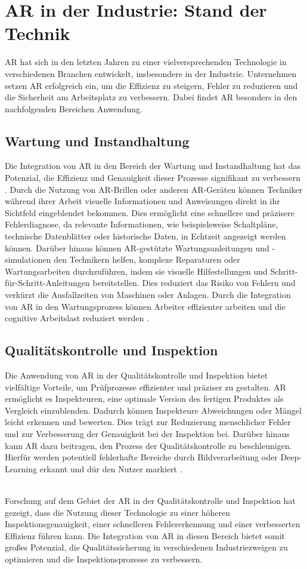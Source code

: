 \section{AR in der Industrie: Stand der Technik}

AR hat sich in den letzten Jahren zu einer vielversprechenden Technologie in
verschiedenen Branchen entwickelt, insbesondere in der Industrie. Unternehmen
setzen AR erfolgreich ein, um die Effizienz zu steigern, Fehler zu reduzieren
und die Sicherheit am Arbeitsplatz zu verbessern. Dabei findet AR besonders in
den nachfolgenden Bereichen Anwendung.

\subsection{Wartung und Instandhaltung}
Die Integration von AR in den Bereich der Wartung und Instandhaltung hat das
Potenzial, die Effizienz und Genauigkeit dieser Prozesse signifikant zu
verbessern \cite{liu2022probing}. Durch die Nutzung von AR-Brillen oder anderen
AR-Geräten können Techniker während ihrer Arbeit visuelle Informationen und
Anweisungen direkt in ihr Sichtfeld eingeblendet bekommen. Dies ermöglicht eine
schnellere und präzisere Fehlerdiagnose, da relevante Informationen, wie
beispielsweise Schaltpläne, technische Datenblätter oder historische Daten, in
Echtzeit angezeigt werden können. Darüber hinaus können AR-gestützte
Wartungsanleitungen und -simulationen den Technikern helfen, komplexe
Reparaturen oder Wartungsarbeiten durchzuführen, indem sie visuelle
Hilfestellungen und Schritt-für-Schritt-Anleitungen bereitstellen.
\cite{4079262} Dies reduziert das Risiko von Fehlern und verkürzt die
Ausfallzeiten von Maschinen oder Anlagen. Durch die Integration von AR in den
Wartungsprozess können Arbeiter effizienter arbeiten und die cognitive
Arbeitslast reduziert werden \cite{5620905}.

\subsection{Qualitätskontrolle und Inspektion}
Die Anwendung von AR in der Qualitätskontrolle und Inspektion bietet
vielfältige Vorteile, um Prüfprozesse effizienter und präziser zu gestalten. AR
ermöglicht es Inspekteuren, eine optimale Version des fertigen Produktes als
Vergleich einzublenden. Dadurch können Inspekteure Abweichungen oder Mängel
leicht erkennen und bewerten. Dies trägt zur Reduzierung menschlicher Fehler
und zur Verbesserung der Genauigkeit bei der Inspektion bei. Darüber hinaus
kann AR dazu beitragen, den Prozess der Qualitätskontrolle zu beschleunigen.
Hierfür werden potentiell fehlerhafte Bereiche durch Bildverarbeitung oder
Deep-Learning erkannt und dür den Nutzer markiert \cite{9112336}.

\\Forschung
auf dem Gebiet der AR in der Qualitätskontrolle und Inspektion hat gezeigt,
dass die Nutzung dieser Technologie zu einer höheren Inspektionsgenauigkeit,
einer schnelleren Fehlererkennung und einer verbesserten Effizienz führen kann.
Die Integration von AR in diesen Bereich bietet somit großes Potenzial, die
Qualitätssicherung in verschiedenen Industriezweigen zu optimieren und die
Inspektionsprozesse zu verbessern.\cite{etonam2019augmented}